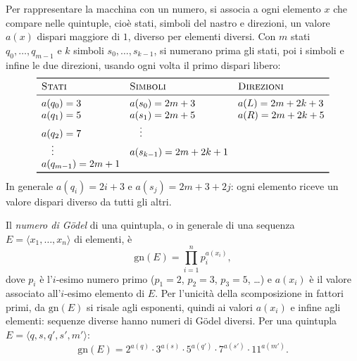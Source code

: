 \documentclass[a4paper, 11pt, oneside]{book}
\theoremstyle{formale}
\begin{document}
    Per rappresentare la macchina con un numero, si associa a ogni elemento $x$ che
    compare nelle quintuple, cio\`e stati, simboli del nastro e direzioni, un valore
    $a(x)$ dispari maggiore di $1$, diverso per elementi diversi. Con $m$ stati
    $q_0, \dots, q_{m-1}$ e $k$ simboli $s_0, \dots, s_{k-1}$, si numerano prima gli
    stati, poi i simboli e infine le due direzioni, usando ogni volta il primo dispari
    libero:
    \begin{equation*}
        \begin{array}{lll}
            \toprule
            \textsc{Stati} & \textsc{Simboli} & \textsc{Direzioni} \\
            \midrule
            a(q_0) = 3 & a(s_0) = 2m + 3 & a(L) = 2m + 2k + 3 \\
            a(q_1) = 5 & a(s_1) = 2m + 5 & a(R) = 2m + 2k + 5 \\
            a(q_2) = 7 & \quad\vdots & \\
            \quad\vdots & a(s_{k-1}) = 2m + 2k + 1 & \\
            a(q_{m-1}) = 2m + 1 & & \\
            \bottomrule
        \end{array}
    \end{equation*}
    In generale $a(q_i) = 2i + 3$ e $a(s_j) = 2m + 3 + 2j$: ogni elemento riceve un valore
    dispari diverso da tutti gli altri.

    Il \emph{numero di G\"odel} di una quintupla, o in generale di una sequenza
    $E = \langle x_1, \dots, x_n \rangle$ di elementi, \`e
    \begin{equation*}
        \mathrm{gn}(E) = \prod_{i=1}^{n} p_i^{a(x_i)},
    \end{equation*}
    dove $p_i$ \`e l'$i$-esimo numero primo ($p_1 = 2$, $p_2 = 3$, $p_3 = 5$, \dots) e
    $a(x_i)$ \`e il valore associato all'$i$-esimo elemento di $E$. Per l'unicit\`a della
    scomposizione in fattori primi, da $\mathrm{gn}(E)$ si risale agli esponenti, quindi
    ai valori $a(x_i)$ e infine agli elementi: sequenze diverse hanno numeri di G\"odel
    diversi. Per una quintupla $E = \langle q, s, q', s', m' \rangle$:
    \begin{equation*}
        \mathrm{gn}(E) = 2^{a(q)} \cdot 3^{a(s)} \cdot 5^{a(q')} \cdot 7^{a(s')}
        \cdot 11^{a(m')}.
    \end{equation*}
\end{document}
